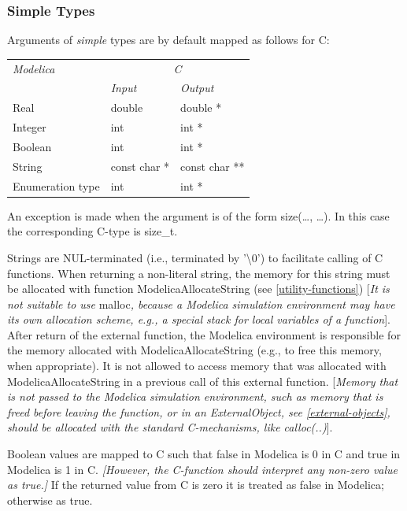 \documentclass[10pt,a4paper]{report}
\def\doublelabel#1{\label{#1}}
\begin{document}
\subsubsection{Simple Types}\doublelabel{simple-types}

Arguments of \emph{simple} types are by default mapped as follows for C:

\begin{longtable}[]{|l|l|l|}
\hline
\emph{Modelica} & \multicolumn{2}{c|}{\emph{C}}\\ 
& \emph{Input} & \emph{Output}\\ \hline
\endhead
Real & double & double *\\ \hline
Integer & int & int *\\ \hline
Boolean & int & int *\\ \hline
String & const char * & const char **\\ \hline
Enumeration type & int & int *\\ \hline
\end{longtable}

An exception is made when the argument is of the form size(\ldots{},
\ldots{}). In this case the corresponding C-type is size\_t.

Strings are NUL-terminated (i.e., terminated by '\textbackslash{}0') to
facilitate calling of C functions. When returning a non-literal string,
the memory for this string must be allocated with function
ModelicaAllocateString (see \ref{utility-functions}) {[}\emph{It is not suitable
to use} malloc\emph{, because a Modelica simulation environment may have
its own allocation scheme, e.g., a special stack for local variables of
a function}{]}. After return of the external function, the Modelica
environment is responsible for the memory allocated with
ModelicaAllocateString (e.g., to free this memory, when appropriate). It
is not allowed to access memory that was allocated with
ModelicaAllocateString in a previous call of this external function.
{[}\emph{Memory that is not passed to the Modelica simulation
environment, such as memory that is freed before leaving the function,
or in an ExternalObject, see \ref{external-objects}, should be allocated
with the standard C-mechanisms, like calloc(..)}{]}.

Boolean values are mapped to C such that false in Modelica is 0 in C and
true in Modelica is 1 in C. \emph{{[}However, the C-function should
interpret any non-zero value as true.{]}} If the returned value from C
is zero it is treated as false in Modelica; otherwise as true.
\end{document}
